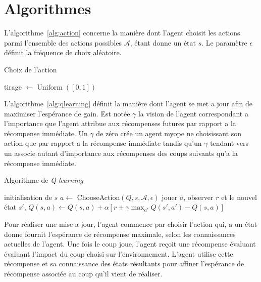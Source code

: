 \documentclass{report}
\DeclareMathOperator{\argmax}{argmax}
\DeclareMathOperator{\uniform}{Uniform}
\begin{document}
\section{Algorithmes}\label{sec:algorithmes}

L'algorithme~\ref{alg:action} concerne la manière dont l'agent choisit les
actions parmi l'ensemble des actions possibles \(\mathcal{A}\), étant donne un
état \(s\). Le paramètre \(\epsilon\) définit la fréquence de choix aléatoire.
\begin{algorithm}
  \caption{Choix de l'action}\label{alg:action}
  \begin{algorithmic}
    [1]
    \State{} tirage \(\gets \uniform([0, 1])\)
    \Return{\(\argmax_{a\in\mathcal{A}} Q(s, a)\)}
    \Else{}
    \Return{\(\uniform(\mathcal{A})\)}
    \EndIf{}
    \EndProcedure{}
  \end{algorithmic}
\end{algorithm}


L'algorithme~\ref{alg:qlearning} définit la manière dont l'agent se met a jour
afin de maximiser l'espérance de gain. Est notée \(\gamma\) la vision de
l'agent correspondant a l'importance que l'agent attribue aux récompenses
futures par rapport a la récompense immédiate. Un \(\gamma\) de zéro crée un
agent myope ne choisissant son action que par rapport a la récompense immédiate
tandis qu'un \(\gamma\) tendant vers un associe autant d'importance aux
récompenses des coups suivants qu'a la récompense immédiate.
\begin{algorithm}
  \caption{Algorithme de \textit{Q-learning}}\label{alg:qlearning}
  \begin{algorithmic}
    [1]
    \Repeat{}
    \State{} initialisation de \(s\)
    \Repeat{}
    \State{} \(a \gets\) ChooseAction$(Q, s, \mathcal{A}, \epsilon)$
    \State{} jouer \(a\), observer \(r\) et le nouvel \'etat \(s'\),
    \State{} \(Q(s, a) \gets Q(s, a) + \alpha\left[ r + \gamma \max_{a'}
      Q(s', a') - Q(s, a)\right]\)
    \EndProcedure{}
  \end{algorithmic}
\end{algorithm}

Pour réaliser une mise a jour, l'agent commence par choisir l'action qui, a un
état donne fournit l'espérance de récompense maximale, selon les connaissances
actuelles de l'agent. Une fois le coup joue, l'agent reçoit une récompense
évaluant évaluant l'impact du coup choisi sur l'environnement. L'agent utilise
cette récompense et sa connaissance des états résultants pour affiner
l'espérance de récompense associée au coup qu'il vient de réaliser.
\end{document}
